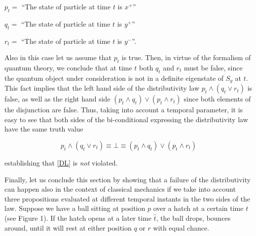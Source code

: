 \documentclass[11pt, executivepaper]{article}
\begin{document}
\begin{description}
    \item $p_t =$ ``The state of particle at time $t$ is $x^+$''
    \item $q_t =$ ``The state of particle at time $t$ is $y^+$''
    \item $r_t =$ ``The state of particle at time $t$ is $y^-$''.
\end{description}

\noindent Also in this case let us assume that $p_t$ is true. Then, in virtue of the formalism of quantum theory, we conclude that at time $t$ both $q_t$ and $r_t$ must be false, since the quantum object under consideration is not in a definite eigenstate of $S_y$ at $t$. This fact implies that the left hand side of the distributivity law $p_t \wedge (q_t \vee r_t)$ is false, as well as the right hand side $(p_t \wedge  q_t) \vee (p_t \wedge r_t)$ since both elements of the disjunction are false. Thus, taking into account a temporal parameter, it is easy to see that both sides of the bi-conditional expressing the distributivity law have the same truth value

$$p_t \wedge (q_t \vee r_t) \equiv \bot \equiv (p_t \wedge q_t) \vee (p_t\wedge r_t)$$

\noindent  establishing that \eqref{DL} is \emph{not} violated.

Finally, let us conclude this section by showing that a failure of the distributivity can happen also in the context of classical mechanics if we take into account three propositions evaluated at different temporal instants in the two sides of the law. Suppose we have a ball sitting at position $p$ over a hatch at a certain time $t$ (see Figure 1). If the hatch opens at a later time $\hat{t}$, the ball drops, bounces around, until it will rest at either position $q$ or $r$ with equal chance. 
\end{document}

